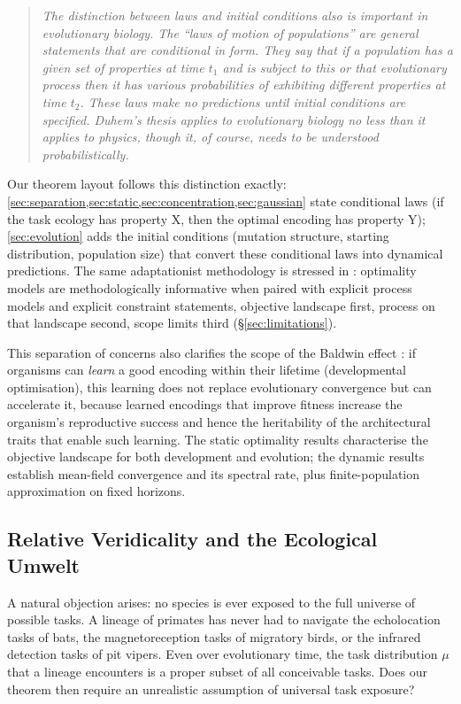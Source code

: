 \documentclass[12pt]{article}
\begin{document}
\begin{quote}\itshape
The distinction between laws and initial conditions also is important in evolutionary biology. The ``laws of motion of populations'' are general statements that are conditional in form. They say that if a population has a given set of properties at time $t_1$ and is subject to this or that evolutionary process then it has various probabilities of exhibiting different properties at time $t_2$. These laws make no predictions until initial conditions are specified. Duhem's thesis applies to evolutionary biology no less than it applies to physics, though it, of course, needs to be understood probabilistically.
\end{quote}

Our theorem layout follows this distinction exactly: \cref{sec:separation,sec:static,sec:concentration,sec:gaussian} state conditional laws (if the task ecology has property X, then the optimal encoding has property Y); \cref{sec:evolution} adds the initial conditions (mutation structure, starting distribution, population size) that convert these conditional laws into dynamical predictions. The same adaptationist methodology is stressed in \citet{sober_2024}: optimality models are methodologically informative when paired with explicit process models and explicit constraint statements, objective landscape first, process on that landscape second, scope limits third (\S\ref{sec:limitations}).

This separation of concerns also clarifies the scope of the Baldwin effect \citep{baldwin_1896,hinton_nowlan_1987}: if organisms can \emph{learn} a good encoding within their lifetime (developmental optimisation), this learning does not replace evolutionary convergence but can accelerate it, because learned encodings that improve fitness increase the organism's reproductive success and hence the heritability of the architectural traits that enable such learning. The static optimality results characterise the objective landscape for both development and evolution; the dynamic results establish mean-field convergence and its spectral rate, plus finite-population approximation on fixed horizons.

\subsection{Relative Veridicality and the Ecological Umwelt}\label{sec:umwelt}

A natural objection arises: no species is ever exposed to the full universe of possible tasks. A lineage of primates has never had to navigate the echolocation tasks of bats, the magnetoreception tasks of migratory birds, or the infrared detection tasks of pit vipers. Even over evolutionary time, the task distribution $\mu$ that a lineage encounters is a proper subset of all conceivable tasks. Does our theorem then require an unrealistic assumption of universal task exposure?
\end{document}
